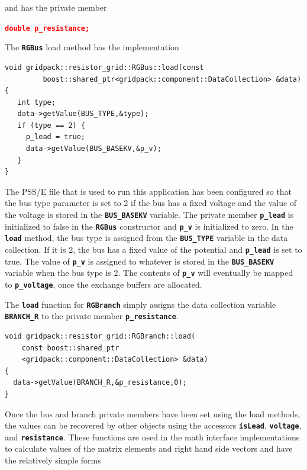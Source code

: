 \documentclass[12pt]{report} %
\begin{document}
and has the private member

\textcolor{red}{\texttt{\textbf{double p\_resistance;}}}

The \texttt{\textbf{RGBus}} load method has the implementation

{
\color{red}
\begin{Verbatim}[fontseries=b]
void gridpack::resistor_grid::RGBus::load(const
         boost::shared_ptr<gridpack::component::DataCollection> &data)
{
   int type;
   data->getValue(BUS_TYPE,&type);
   if (type == 2) {
     p_lead = true;
     data->getValue(BUS_BASEKV,&p_v);
   }
}
\end{Verbatim}
}

The PSS/E file that is used to run this application has been configured so that the bus type parameter is set to 2 if the bus has a fixed voltage and the value of the voltage is stored in the \texttt{\textbf{BUS\_BASEKV}} variable. The private member \texttt{\textbf{p\_lead}} is initialized to false in the \texttt{\textbf{RGBus}} constructor and \texttt{\textbf{p\_v}} is initialized to zero. In the \texttt{\textbf{load}} method, the bus type is assigned from the \texttt{\textbf{BUS\_TYPE}} variable in the data collection. If it is 2, the bus has a fixed value of the potential and \texttt{\textbf{p\_lead}} is set to true. The value of \texttt{\textbf{p\_v}} is assigned to whatever is stored in the \texttt{\textbf{BUS\_BASEKV}} variable when the bus type is 2. The contents of \texttt{\textbf{p\_v}} will eventually be mapped to \texttt{\textbf{p\_voltage}}, once the exchange buffers are allocated.

The \texttt{\textbf{load}} function for \texttt{\textbf{RGBranch}} simply assigns the data collection variable \texttt{\textbf{BRANCH\_R}} to the private member \texttt{\textbf{p\_resistance}}.

{
\color{red}
\begin{Verbatim}[fontseries=b]
void gridpack::resistor_grid::RGBranch::load(
    const boost::shared_ptr
    <gridpack::component::DataCollection> &data)
{
  data->getValue(BRANCH_R,&p_resistance,0);
}
\end{Verbatim}
}

Once the bus and branch private members have been set using the load methods, the values can be recovered by other objects using the accessors \texttt{\textbf{isLead}}, \texttt{\textbf{voltage}}, and \texttt{\textbf{resistance}}. These functions are used in the math interface implementations to calculate values of the matrix elements and right hand side vectors and have the relatively simple forms
\end{document}
